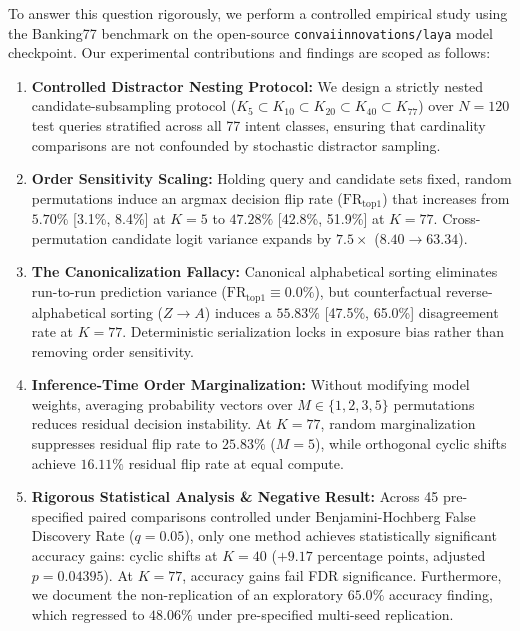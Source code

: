 \documentclass[10pt]{article}
\begin{document}
To answer this question rigorously, we perform a controlled empirical study using the Banking77 benchmark \citep{casanueva2020efficient} on the open-source \nolinkurl{convaiinnovations/laya} model checkpoint. Our experimental contributions and findings are scoped as follows:
\begin{enumerate}
    \item \textbf{Controlled Distractor Nesting Protocol:} We design a strictly nested candidate-subsampling protocol ($K_5 \subset K_{10} \subset K_{20} \subset K_{40} \subset K_{77}$) over $N=120$ test queries stratified across all 77 intent classes, ensuring that cardinality comparisons are not confounded by stochastic distractor sampling.
    \item \textbf{Order Sensitivity Scaling:} Holding query and candidate sets fixed, random permutations induce an argmax decision flip rate ($\mathrm{FR}_{\mathrm{top1}}$) that increases from $5.70\%$ [3.1\%, 8.4\%] at $K=5$ to $47.28\%$ [42.8\%, 51.9\%] at $K=77$. Cross-permutation candidate logit variance expands by $7.5\times$ ($8.40 \to 63.34$).
    \item \textbf{The Canonicalization Fallacy:} Canonical alphabetical sorting eliminates run-to-run prediction variance ($\mathrm{FR}_{\mathrm{top1}} \equiv 0.0\%$), but counterfactual reverse-alphabetical sorting ($Z \to A$) induces a $55.83\%$ [47.5\%, 65.0\%] disagreement rate at $K=77$. Deterministic serialization locks in exposure bias rather than removing order sensitivity.
    \item \textbf{Inference-Time Order Marginalization:} Without modifying model weights, averaging probability vectors over $M \in \{1, 2, 3, 5\}$ permutations reduces residual decision instability. At $K=77$, random marginalization suppresses residual flip rate to $25.83\%$ ($M=5$), while orthogonal cyclic shifts achieve $16.11\%$ residual flip rate at equal compute.
    \item \textbf{Rigorous Statistical Analysis \& Negative Result:} Across 45 pre-specified paired comparisons controlled under Benjamini-Hochberg False Discovery Rate ($q=0.05$), only one method achieves statistically significant accuracy gains: cyclic shifts at $K=40$ ($+9.17$ percentage points, adjusted $p=0.04395$). At $K=77$, accuracy gains fail FDR significance. Furthermore, we document the non-replication of an exploratory $65.0\%$ accuracy finding, which regressed to $48.06\%$ under pre-specified multi-seed replication.
\end{enumerate}
\end{document}
